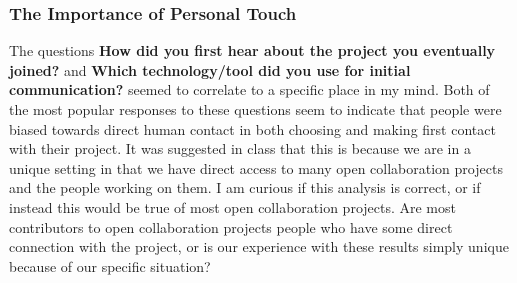 \subsubsection{The Importance of Personal Touch}
The questions {\bf How did you first hear about the project you eventually joined?} and {\bf Which technology/tool did you use for initial communication?} seemed to correlate to a specific place in my mind.  Both of the most popular responses to these questions seem to indicate that people were biased towards direct human contact in both choosing and making first contact with their project.  It was suggested in class that this is because we are in a unique setting in that we have direct access to many open collaboration projects and the people working on them.  I am curious if this analysis is correct, or if instead this would be true of most open collaboration projects.  Are most contributors to open collaboration projects people who have some direct connection with the project, or is our experience with these results simply unique because of our specific situation?
